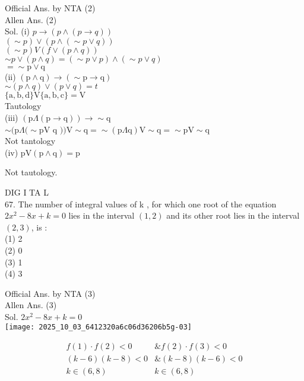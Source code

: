 \documentclass[10pt]{article}
\begin{document}
Official Ans. by NTA (2)\\
Allen Ans. (2)\\
Sol. (i) \(p \rightarrow(p \wedge(p \rightarrow q))\)\\
\((\sim p) \vee(p \wedge(\sim p \vee q))\)\\
\((\sim p) V(f \vee(p \wedge q))\)\\
\(\sim p \vee(p \wedge q)=(\sim p \vee p) \wedge(\sim p \vee q)\)\\
\(=\sim \mathrm{p} \vee \mathrm{q}\)\\
(ii) \((\mathrm{p} \wedge \mathrm{q}) \rightarrow(\sim \mathrm{p} \rightarrow \mathrm{q})\)\\
\(\sim(p \wedge q) \vee(p \vee q)=t\)\\
\(\{\mathrm{a}, \mathrm{b}, \mathrm{d}\} \mathrm{V}\{\mathrm{a}, \mathrm{b}, \mathrm{c}\}=\mathrm{V}\)\\
Tautology\\
(iii) \((\mathrm{p} \Lambda(\mathrm{p} \rightarrow \mathrm{q})) \rightarrow \sim \mathrm{q}\)\\
\(\sim(\mathrm{p} \Lambda(\sim \mathrm{p} \mathrm{V}\) q \()) \mathrm{V} \sim \mathrm{q}=\sim(\mathrm{p} \Lambda \mathrm{q}) \mathrm{V} \sim \mathrm{q}=\sim \mathrm{p} \mathrm{V} \sim \mathrm{q}\)\\
Not tantology\\
(iv) \(\mathrm{p} \mathrm{V}(\mathrm{p} \wedge \mathrm{q})=\mathrm{p}\)

Not tautology.

DIG I TA L\\
67. The number of integral values of k , for which one root of the equation \(2 x^{2}-8 x+k=0\) lies in the interval \((1,2)\) and its other root lies in the interval \((2,3)\), is :\\
(1) 2\\
(2) 0\\
(3) 1\\
(4) 3

Official Ans. by NTA (3)\\
Allen Ans. (3)\\
Sol. \(2 x^{2}-8 x+k=0\)\\
\texttt{[image: 2025\_10\_03\_6412320a6c06d36206b5g-03]}

\[
\begin{array}{ll}
f(1) \cdot f(2)<0 & \& f(2) \cdot f(3)<0 \\
(k-6)(k-8)<0 & \&(k-8)(k-6)<0 \\
k \in(6,8) & k \in(6,8)
\end{array}
\]
\end{document}

